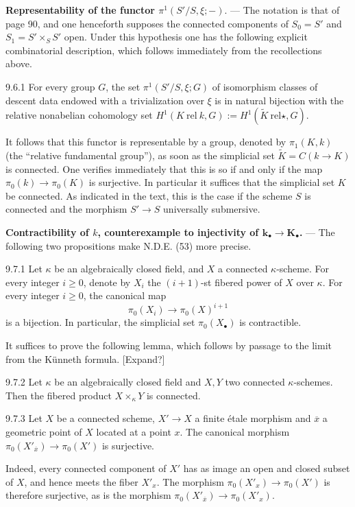 \textbf{Representability of the functor $\pi^1(S'/S,\xi;-)$}. --- The notation is that of page 90, and one henceforth supposes the connected components of $S_0=S'$ and $S_1=S'\times_S S'$ open. Under this hypothesis one has the following explicit combinatorial description, which follows immediately from the recollections above.
\begin{proposition}{9.6.1}\label{X.9.6.1}
For every group $G$, the set $\pi^1(S'/S,\xi;G)$ of isomorphism classes of descent data endowed with a trivialization over $\xi$ is in natural bijection with the relative nonabelian cohomology set $H^1(K\ \mathrm{rel}\ k,G):=H^1(\widetilde K\ \mathrm{rel}\star,G)$.
\end{proposition}
It follows that this functor is representable by a group, denoted by $\pi_1(K,k)$ (the ``relative fundamental group''), as soon as the simplicial set $\widetilde K=C(k\to K)$ is connected. One verifies immediately that this is so if and only if the map $\pi_0(k)\to\pi_0(K)$ is surjective. In particular it suffices that the simplicial set $K$ be connected. As indicated in the text, this is the case if the scheme $S$ is connected and the morphism $S'\to S$ universally submersive.

\textbf{Contractibility of $k$, counterexample to injectivity of $\mathbf k_\bullet\to\mathbf K_\bullet$.} --- The following two propositions make N.D.E. (53) more precise.
\begin{proposition}{9.7.1}\label{X.9.7.1}
Let $\kappa$ be an algebraically closed field, and $X$ a connected $\kappa$-scheme. For every integer $i\geq0$, denote by $X_i$ the $(i+1)$-st fibered power of $X$ over $\kappa$. For every integer $i\geq0$, the canonical map
\[
\pi_0(X_i)\to\pi_0(X)^{i+1}
\]
is a bijection. In particular, the simplicial set $\pi_0(X_\bullet)$ is contractible.
\end{proposition}
It suffices to prove the following lemma, which follows by passage to the limit from the Künneth formula. [Expand?]
\begin{lemma}{9.7.2}\label{X.9.7.2}
Let $\kappa$ be an algebraically closed field and $X,Y$ two connected $\kappa$-schemes. Then the fibered product $X\times_\kappa Y$ is connected.
\end{lemma}
\begin{proposition}{9.7.3}\label{X.9.7.3}
Let $X$ be a connected scheme, $X'\to X$ a finite étale morphism and $\overline x$ a geometric point of $X$ located at a point $x$. The canonical morphism $\pi_0(X'_{\overline x})\to\pi_0(X')$ is surjective.
\end{proposition}
Indeed, every connected component of $X'$ has as image an open and closed subset of $X$, and hence meets the fiber $X'_x$. The morphism $\pi_0(X'_x)\to\pi_0(X')$ is therefore surjective, as is the morphism $\pi_0(X'_{\overline x})\to\pi_0(X'_x)$.

